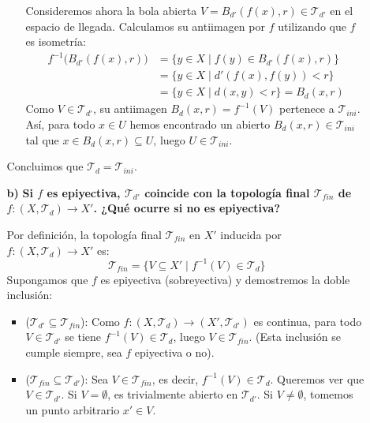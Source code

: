 \begin{enumerate}
\begin{enumerate}
\begin{dem}
\begin{itemize}
            Consideremos ahora la bola abierta $V = B_{d'}(f(x), r) \in \mathcal{T}_{d'}$ en el espacio de llegada. Calculamos su antiimagen por $f$ utilizando que $f$ es isometría:
            \begin{align*}
                f^{-1}\big(B_{d'}(f(x), r)\big) &= \{ y \in X \mid f(y) \in B_{d'}(f(x), r) \} \\
                &= \{ y \in X \mid d'(f(x), f(y)) < r \} \\
                &= \{ y \in X \mid d(x, y) < r \} = B_d(x, r)
            \end{align*}
            Como $V \in \mathcal{T}_{d'}$, su antiimagen $B_d(x, r) = f^{-1}(V)$ pertenece a $\mathcal{T}_{ini}$. Así, para todo $x \in U$ hemos encontrado un abierto $B_d(x, r) \in \mathcal{T}_{ini}$ tal que $x \in B_d(x, r) \subseteq U$, luego $U \in \mathcal{T}_{ini}$.
        \end{itemize}
        Concluimos que $\mathcal{T}_d = \mathcal{T}_{ini}$.
    \end{dem}

    \item[\textbf{b)}] \textbf{Si $f$ es epiyectiva, $\mathcal{T}_{d'}$ coincide con la topología final $\mathcal{T}_{fin}$ de $f : (X, \mathcal{T}_d) \to X'$. ¿Qué ocurre si no es epiyectiva?}
    
    \begin{dem}
        Por definición, la topología final $\mathcal{T}_{fin}$ en $X'$ inducida por $f : (X, \mathcal{T}_d) \to X'$ es:
        \[
            \mathcal{T}_{fin} = \{ V \subseteq X' \mid f^{-1}(V) \in \mathcal{T}_d \}
        \]
        Supongamos que $f$ es epiyectiva (sobreyectiva) y demostremos la doble inclusión:

        \begin{itemize}
            \item ($\mathcal{T}_{d'} \subseteq \mathcal{T}_{fin}$): Como $f : (X, \mathcal{T}_d) \to (X', \mathcal{T}_{d'})$ es continua, para todo $V \in \mathcal{T}_{d'}$ se tiene $f^{-1}(V) \in \mathcal{T}_d$, luego $V \in \mathcal{T}_{fin}$. (Esta inclusión se cumple siempre, sea $f$ epiyectiva o no).

            \item ($\mathcal{T}_{fin} \subseteq \mathcal{T}_{d'}$): Sea $V \in \mathcal{T}_{fin}$, es decir, $f^{-1}(V) \in \mathcal{T}_d$. Queremos ver que $V \in \mathcal{T}_{d'}$. Si $V = \emptyset$, es trivialmente abierto en $\mathcal{T}_{d'}$. Si $V \neq \emptyset$, tomemos un punto arbitrario $x' \in V$.
            

\end{itemize}
\end{dem}
\end{enumerate}
\end{enumerate}
